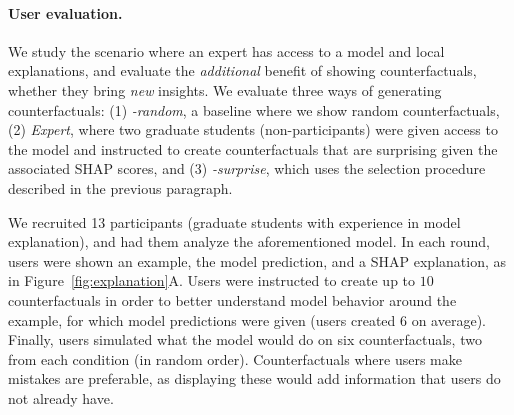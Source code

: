 \newcommand{\cshap}{\emph{\sysname-surprise}\xspace}
\newcommand{\crandom}{\emph{\sysname-random}\xspace}
\newcommand{\chuman}{\emph{Expert}\xspace}

\paragraph{User evaluation.} We study the scenario where an expert has access to a model and local explanations, and evaluate the \emph{additional} benefit of showing counterfactuals, \ie whether they bring \emph{new} insights. 
We evaluate three ways of generating counterfactuals: (1) \crandom, a baseline where we show random \sysname{} counterfactuals, (2) \chuman, where two graduate students (non-participants) were given access to the model and instructed to create counterfactuals that are surprising given the associated SHAP scores, and (3) \cshap, which uses the selection procedure described in the previous paragraph.

We recruited 13 participants (graduate students with experience in model explanation), and had them analyze the aforementioned \qqp model. In each round, users were shown an example, the model prediction, and a SHAP explanation, as in Figure~\ref{fig:explanation}A. Users were instructed to create up to $10$ counterfactuals in order to better understand model behavior around the example, for which model predictions were given (users created $6$ on average). 
Finally, users simulated what the model would do on six counterfactuals, two from each condition (in random order). Counterfactuals where users make mistakes are preferable, as displaying these would add information that users do not already have.




